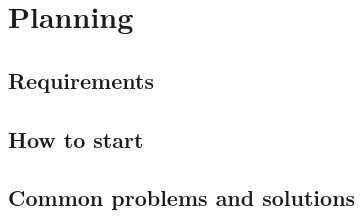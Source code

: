 \documentclass[main.tex]{subfiles}
\begin{document}
	\chapter{Planning}
	
	\section{Requirements}
	
	\section{How to start}
	
	\section{Common problems and solutions}
\end{document}
